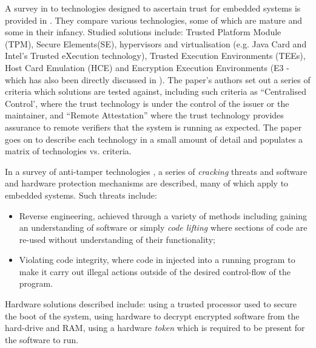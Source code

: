 A survey in to technologies designed to ascertain trust for embedded systems is provided in \cite{Shepherd2016}. They compare various technologies, some of which are mature and some in their infancy. Studied solutions include: Trusted Platform Module (TPM), Secure Elements(SE), hypervisors and virtualisation (e.g. Java Card and Intel's Trusted eXecution technology), Trusted Execution Environments (TEEs), Host Card Emulation (HCE) and Encryption Execution Environments (E3 - which has also been directly discussed in \cite{Lee2016}). The paper's authors set out a series of criteria which solutions are tested against, including such criteria as ``Centralised Control', where the trust technology is under the control of the issuer or the maintainer, and ``Remote Attestation'' where the trust technology provides assurance to remote verifiers that the system is running as expected. The paper goes on to describe each technology in a small amount of detail and populates a matrix of technologies vs. criteria. 

In a survey of anti-tamper technologies \cite{Bryant2004}, a series of \textit{cracking} threats and software and hardware protection mechanisms are described, many of which apply to embedded systems. Such threats include: 
\begin{itemize}
	\item Reverse engineering, achieved through a variety of methods including gaining an understanding	of software or simply \textit{code lifting} where sections of code are re-used without understanding of their functionality;
	\item Violating code integrity, where code in injected into a running program to make it carry out illegal actions outside of the desired control-flow of the program.
\end{itemize} 
Hardware solutions described include: using a trusted processor used to secure the boot of the system, using hardware to decrypt encrypted software from the hard-drive and RAM, using a hardware \textit{token} which is required to be present for the software to run.

